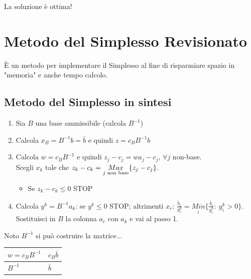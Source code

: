 La soluzione è ottima!

\section{Metodo del Simplesso Revisionato}
È un metodo per implementare il Simplesso al fine di risparmiare spazio in "memoria" e anche tempo calcolo.

\subsection{Metodo del Simplesso in sintesi}
\begin{enumerate}
	\item Sia $B$ una base ammissibile (calcola $B^{-1}$)
	\item Calcola $x_{B}=B^{-1}b=\bar{b}$ e quindi $z=c_{B}B^{-1}b$
	\item Calcola $w=c_{B}B^{-1}$ e quindi $z_{j}-c_{j}=w a_{j}-c_{j}$, $\forall j$ non-base.\\
	Scegli $x_{k}$ tale che $z_{k}-c_{k}=\underset{j \textnormal{ non base}}{Max}\{z_{j}-c_{j}\}$.
	\begin{itemize}
		\item Se $z_{k}-c_{k}\le 0$ STOP
	\end{itemize}
	\item Calcola $y^{k}=B^{-1}a_{k}$: se $y^{k}\le 0$ STOP; altrimenti
	$x_{r}$: $\frac{\bar{b}_{r}}{y^{k}_{r}}=\underset{i}{Min}\{\frac{\bar{b}_{i}}{y_{i}^{k}}:\ y_{i}^{k}>0\}$.\\
	Sostituisci in $B$ la colonna $a_{r}$ con $a_{k}$ e vai al passo 1.
\end{enumerate}

Noto $B^{-1}$ si può costruire la matrice...
\begin{table}[h]
	\centering
	\begin{tabular}{|l|l|}
		\hline
		$w=c_{B}B^{-1}$ & $c_{B}\bar{b}$ \\ \hline
		$B^{-1}$ & $\bar{b}$ \\ \hline 
	\end{tabular}
\end{table}

